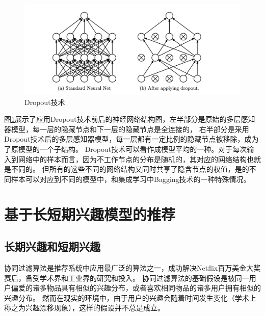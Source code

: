 \begin{figure}[htbp]
\centering
\includegraphics[scale=0.5]{images/dropout.png}
\caption{Dropout技术}
\label{fig:dropout}
\end{figure}

图\ref{fig:dropout}展示了应用Dropout技术前后的神经网络结构图，左半部分是原始的多层感知器模型，每一层的隐藏节点和下一层的隐藏节点是全连接的，
右半部分是采用Dropout技术后的多层感知器模型，每一层都有一定比例的隐藏节点被移除，成为了原模型的一个子结构。
Dropout技术可以看作成模型平均的一种。对于每次输入到网络中的样本而言，因为不工作节点的分布是随机的，其对应的网络结构也就是不同的。
但所有的这些不同的网络结构又同时共享了隐含节点的权值，是的不同样本可以对应到不同的模型中，和集成学习中Bagging技术的一种特殊情况。

\section{基于长短期兴趣模型的推荐}
\subsection{长期兴趣和短期兴趣}
协同过滤算法是推荐系统中应用最广泛的算法之一，成功解决Netflix百万美金大奖赛后，备受学术界和工业界的研究和投入。
协同过滤算法的基础假设是被同一用户偏爱的诸多物品具有相似的兴趣分布，或者喜欢相同物品的诸多用户拥有相似的兴趣分布。
然而在现实的环境中，由于用户的兴趣会随着时间发生变化（学术上称之为兴趣漂移现象），这样的假设并不总是成立。

